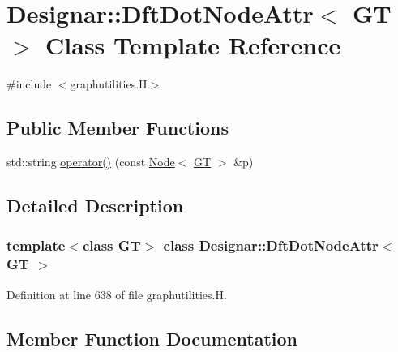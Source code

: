 \hypertarget{class_designar_1_1_dft_dot_node_attr}{}\section{Designar\+:\+:Dft\+Dot\+Node\+Attr$<$ GT $>$ Class Template Reference}
\label{class_designar_1_1_dft_dot_node_attr}


{\ttfamily \#include $<$graphutilities.\+H$>$}

\subsection*{Public Member Functions}
\begin{DoxyCompactItemize}
\item 
std\+::string \hyperlink{class_designar_1_1_dft_dot_node_attr_a7427d5a0fe37ecbb7fa9c07f9486d609}{operator()} (const \hyperlink{namespace_designar_a5af326c65aa2bd26b26c410f2030d09e}{Node}$<$ \hyperlink{demo-buildgraph_8_c_a3001c40d2c31ca87ed96cd7d1334a55e}{GT} $>$ \&p)
\end{DoxyCompactItemize}


\subsection{Detailed Description}
\subsubsection*{template$<$class GT$>$\newline
class Designar\+::\+Dft\+Dot\+Node\+Attr$<$ G\+T $>$}



Definition at line 638 of file graphutilities.\+H.



\subsection{Member Function Documentation}
\mbox{\label{class_designar_1_1_dft_dot_node_attr_a7427d5a0fe37ecbb7fa9c07f9486d609}} 
